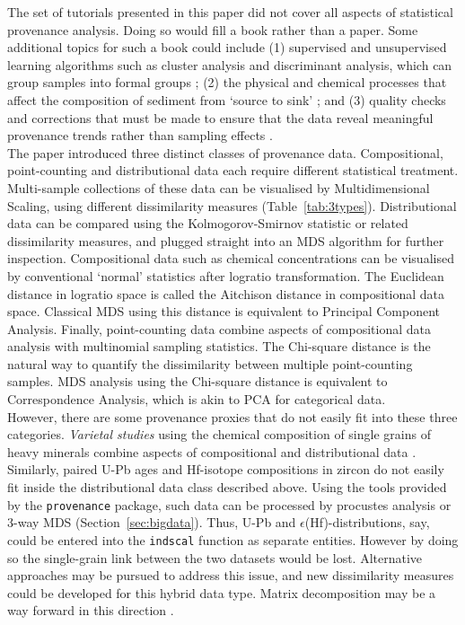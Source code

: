 \documentclass[11pt]{article}
\begin{document}
The set of tutorials presented in this paper did not cover all aspects
of statistical provenance analysis. Doing so would fill a book rather
than a paper. Some additional topics for such a book could include (1)
supervised and unsupervised learning algorithms such as cluster
analysis and discriminant analysis, which can group samples into
formal groups \citep{bhatia1983, bhatia1986, armstrong2005,
  tolosana2018}; (2) the physical and chemical processes that affect
the composition of sediment from `source to sink' \citep{allen2008,
  weltje2004, weltje2012, garzanti2018a}; and (3) quality checks and
corrections that must be made to ensure that the data reveal
meaningful provenance trends rather than sampling effects
\citep{garzanti2007, garzanti2009, resentini2013, malusa2013,
  malusa2019b}.\\

The paper introduced three distinct classes of provenance
data. Compositional, point-counting and distributional data each
require different statistical treatment. Multi-sample collections of
these data can be visualised by Multidimensional Scaling, using
different dissimilarity measures (Table~\ref{tab:3types}).
Distributional data can be compared using the Kolmogorov-Smirnov
statistic or related dissimilarity measures, and plugged straight into
an MDS algorithm for further inspection.  Compositional data such as
chemical concentrations can be visualised by conventional `normal'
statistics after logratio transformation.  The Euclidean distance in
logratio space is called the Aitchison distance in compositional data
space. Classical MDS using this distance is equivalent to Principal
Component Analysis.  Finally, point-counting data combine aspects of
compositional data analysis with multinomial sampling statistics. The
Chi-square distance is the natural way to quantify the dissimilarity
between multiple point-counting samples. MDS analysis using the
Chi-square distance is equivalent to Correspondence Analysis, which is
akin to PCA for categorical data.\\

However, there are some provenance proxies that do not easily fit into
these three categories. \emph{Varietal studies} using the chemical
composition of single grains of heavy minerals combine aspects of
compositional and distributional data \citep{morton1991,
  tolosana2018}. Similarly, paired U-Pb ages and Hf-isotope
compositions in zircon \citep{gerdes2006} do not easily fit inside the
distributional data class described above.  Using the tools provided
by the \texttt{provenance} package, such data can be processed by
procustes analysis or 3-way MDS (Section~\ref{sec:bigdata}). Thus,
U-Pb and $\epsilon$(Hf)-distributions, say, could be entered into the
\texttt{indscal} function as separate entities. However by doing so
the single-grain link between the two datasets would be
lost. Alternative approaches may be pursued to address this issue, and
new dissimilarity measures could be developed for this hybrid data
type.  Matrix decomposition may be a way forward in this direction
\citep{paatero1994, bloemsma2012, martinez2017}.
\end{document}
